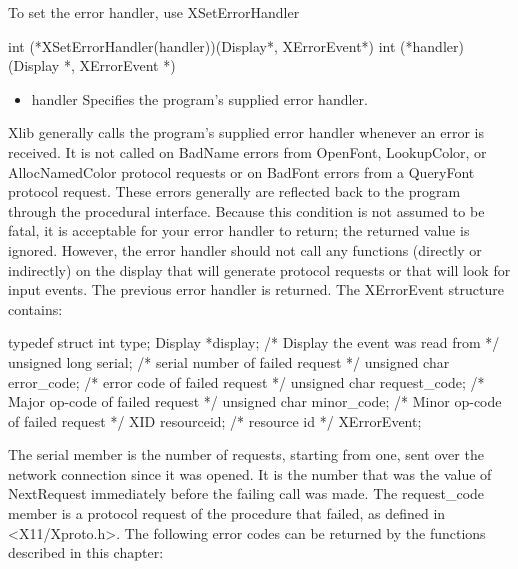 \documentclass{report}
\begin{document}
\begin{itemize}
            \bigbreak \noindent 
            To set the error handler, use XSetErrorHandler
            \bigbreak \noindent 
            \begin{cppcode}
                int (*XSetErrorHandler(handler))(Display*, XErrorEvent*)
                    int (*handler)(Display *, XErrorEvent *)
            \end{cppcode}
            \bigbreak \noindent
            \begin{itemize}
                \item handler Specifies the program’s supplied error handler.
            \end{itemize}
            \bigbreak \noindent 
            Xlib generally calls the program’s supplied error handler whenever an error is received. It is not called on BadName errors from OpenFont, LookupColor, or AllocNamedColor protocol requests or on BadFont errors from a QueryFont protocol request. These errors generally are reflected back to the program through the procedural interface. Because this condition is not assumed to be fatal, it is acceptable for your error handler to return; the returned value is ignored. However, the error handler should not call any functions (directly or indirectly) on the display that will generate protocol requests or that will look for input events. The previous error handler is returned.
            \bigbreak \noindent 
            The XErrorEvent structure contains:
            \bigbreak \noindent 
            \begin{cppcode}
                typedef struct {
                    int type;
                    Display *display;                   /* Display the event was read from */
                    unsigned long serial;               /* serial number of failed request */
                    unsigned char error_code;           /* error code of failed request */
                    unsigned char request_code;         /* Major op-code of failed request */
                    unsigned char minor_code;           /* Minor op-code of failed request */
                    XID resourceid;                     /* resource id */
                } XErrorEvent;
            \end{cppcode}
            \bigbreak \noindent 
            The serial member is the number of requests, starting from one, sent over the network connection since it was opened. It is the number that was the value of NextRequest immediately before the failing call was made. The request\_code member is a protocol request of the procedure that failed, as defined in <X11/Xproto.h>. The following error codes can be returned by the functions described in this chapter:

\end{itemize}
\end{document}
